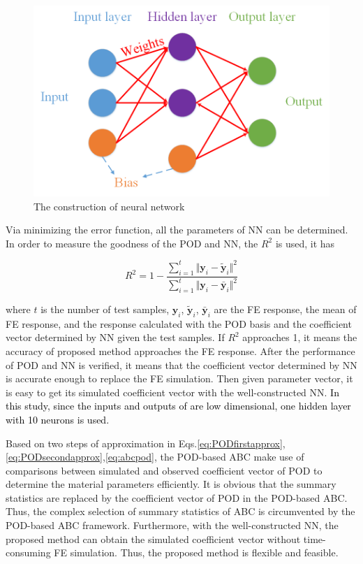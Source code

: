 \documentclass[review]{elsarticle}
\begin{document}
\begin{figure}[h!]
\centering
\includegraphics[width=1\textwidth]{./figs/NN.png}
\caption{The construction of neural network}
\label{fig:NN}
\end{figure}

Via minimizing the error function, all the parameters of NN can be determined. In order to measure the goodness of the POD and NN, the $R^2$ is used, it has

\begin{equation}
R^2 = 1-\frac{\sum_{i=1}^t \Vert \mathbf{y}_i - \tilde{\mathbf{y}}_i \Vert ^2 }{\sum_{i=1}^t \Vert \mathbf{y}_i - \bar{\mathbf{y}}_i \Vert ^2}
\end{equation}

\noindent where $t$ is the number of test samples, $\mathbf{y}_i$, $\tilde{\mathbf{y}}_i$, $\bar{\mathbf{y}}_i$ are the FE response, the mean of FE response, and the response calculated with the POD basis and the coefficient vector determined by NN given the test samples. If $R^2$ approaches 1, it means the accuracy of proposed method approaches the FE response. After the performance of POD and NN is verified, it means that the coefficient vector determined by NN is accurate enough to replace the FE simulation. Then given parameter vector, it is easy to get its simulated coefficient vector with the well-constructed NN. \textcolor{black}{In this study, since the inputs and outputs of are low dimensional, one hidden layer with 10 neurons is used.} 

Based on two steps of approximation in Eqs.\ref{eq:PODfirstapprox},\ref{eq:PODsecondapprox},\ref{eq:abcpod}, the POD-based ABC make use of comparisons between simulated and observed coefficient vector of POD to determine the material parameters efficiently. It is obvious that the summary statistics are replaced by the coefficient vector of POD in the POD-based ABC. Thus, the complex selection of summary statistics of ABC is circumvented by the POD-based ABC framework. Furthermore, with the well-constructed NN, the proposed method can obtain the simulated coefficient vector without time-consuming FE simulation. Thus, the proposed method is flexible and feasible.
\end{document}

